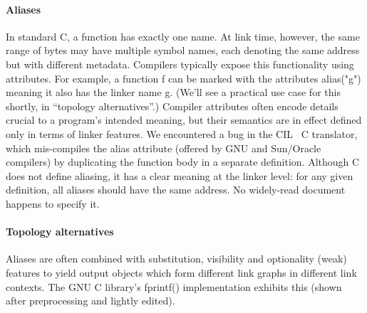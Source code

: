 \paragraph{Aliases}
In standard C, a function has exactly one name. 
At link time, however, the same range of bytes may have multiple symbol names, 
each denoting the same address but with different metadata.
Compilers typically expose this functionality using attributes.
For example, a function \textsf{f} can be marked with the attributes \textsf{alias("g")}
meaning it also has the linker name \textsf{g}.
(We'll see a practical use case for this shortly, in ``topology alternatives''.)
Compiler attributes often encode details crucial to a program's intended meaning,
but their semantics are in effect defined only in terms of linker features.
We encountered a bug in the CIL~\cite{necula-cil-2002} C translator, which mis-compiles the \textsf{alias} attribute
(offered by GNU and Sun/Oracle compilers)
by duplicating the function body in a separate definition.
Although C does not define aliasing, 
it has a clear meaning at the linker level: for any given definition, all aliases should have the same address.
No widely-read document happens to specify it.



\paragraph{Topology alternatives}
Aliases are often combined with substitution, visibility and optionality (weak) features 
to yield output objects which 
form different link graphs in different link contexts.
The GNU C library's \textsf{fprintf()} implementation
exhibits this (shown after preprocessing and lightly edited).

